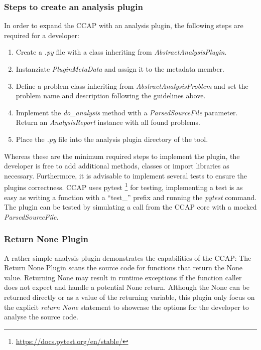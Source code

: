 \subsubsection{Steps to create an analysis plugin}
In order to expand the CCAP with an analysis plugin, the following steps are required for a developer:
\begin{enumerate}
    \item Create a \textit{.py} file with a class inheriting from \textit{AbstractAnalysisPlugin}.
    \item Instanziate \textit{PluginMetaData} and assign it to the metadata member.
    \item Define a problem class inheriting from \textit{AbstractAnalysisProblem} and set the problem name and description following the guidelines above.
    \item Implement the \textit{do\_analysis} method with a \textit{ParsedSourceFile} parameter. Return an \textit{AnalysisReport} instance with all found problems.
    \item Place the \textit{.py} file into the analysis plugin directory of the tool.
\end{enumerate}
Whereas these are the minimum required steps to implement the plugin, the developer is free to add additional methods, classes or import libraries as necessary.
Furthermore, it is advisable to implement several tests to ensure the plugins correctness. CCAP uses pytest \footnote{\url{https://docs.pytest.org/en/stable/}} for testing, implementing a test is as easy as writing a function with a \enquote{test\_} prefix and running the \textit{pytest} command. The plugin can be tested by simulating a call from the CCAP core with a mocked \textit{ParsedSourceFile}. 

\subsubsection{Return None Plugin}
A rather simple analysis plugin demonstrates the capabilities of the CCAP: The Return None Plugin scans the source code for functions that return the None value. Returning None may result in runtime exceptions if the function caller does not expect and handle a potential None return. Although the None can be returned directly or as a value of the returning variable, this plugin only focus on the explicit \textit{return None} statement to showcase the options for the developer to analyse the source code.

